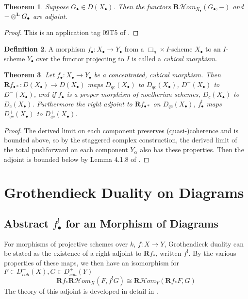\documentclass{report}
\newtheorem{theorem}{Theorem}[section]
\theoremstyle{definition}
\newtheorem{definition}[theorem]{Definition}
\newcommand{\cHom}{\mathcal{H} \textit{om}}
\newcommand{\bR}{\textbf{R}}
\newcommand{\otimesL}{\otimes^{\bf L}}
\begin{document}
\begin{theorem}
	Suppose $G_\bullet \in D(X_\bullet)$.
	Then the functors $\bR \cHom_{X_\bullet}(G_\bullet, -)$ and $-\otimesL G_\bullet$ are adjoint.
\end{theorem}
\begin{proof}
	This is an application tag 09T5 of \cite{stacks}.
\end{proof}

\begin{definition}
	A morphism $f_\bullet : X_\bullet \rightarrow Y_\bullet$ from a $\Box_n \times I$-scheme $X_\bullet$ to an $I$-scheme $Y_\bullet$ over the functor projecting to $I$ is called a \textit{cubical morphism}.
\end{definition}

\begin{theorem}
	\label{thm:pushforwardbounds}
	Let $f_\bullet : X_\bullet \rightarrow Y_\bullet$ be a concentrated, cubical morphism.
	Then $\bR f_{\bullet *} : D(X_\bullet) \rightarrow D(X_\bullet)$ maps $D_{qc}(X_\bullet)$ to $D_{qc}(X_\bullet)$, $D^-(X_\bullet)$ to $D^-(X_\bullet)$, and if $f_\bullet$ is a proper morphism of noetherian schemes, $D_c(X_\bullet)$ to $D_c(X_\bullet)$.
	Furthermore the right adjoint to $\bR f_{\bullet *}$ on $D_{qc}(X_\bullet)$, $f_\bullet^!$ maps $D_{qc}^+(X_\bullet)$ to $D_{qc}^+(X_\bullet)$.
\end{theorem}
\begin{proof}
	The derived limit on each component preserves (quasi-)coherence and is bounded above, so by the staggered complex construction, the derived limit of the total pushforward on each component $Y_\alpha$ also has these properties.
	Then the adjoint is bounded below by Lemma 4.1.8 of \cite{Lipman2009}.
\end{proof}

\chapter{Grothendieck Duality on Diagrams}

\section{Abstract $f_\bullet^!$ for an Morphism of Diagrams}
For morphisms of projective schemes over $k$, $f : X \rightarrow Y$, Grothendieck duality can be stated as the existence of a right adjoint to $\bR f_*$, written $f^!$.
By the various properties of these maps, we then have an isomorphism for $F \in D_{coh}^+(X), G \in D_{coh}^+(Y)$
\[
\bR f_* \bR \cHom_X(F, f^! G) \cong \bR \cHom_Y(\bR f_* F, G)
\]
The theory of this adjoint is developed in detail in \cite{Hartshorne1966}.
\end{document}
